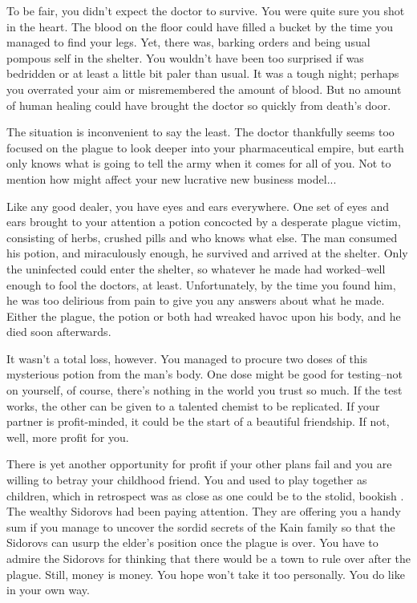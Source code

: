 \documentclass[char]{Pestilence}
\begin{document}
To be fair, you didn't expect the doctor to survive. You were quite sure you shot \cOutsider{\them} in the heart. The blood on the floor could have filled a bucket by the time you managed to find your legs. Yet, there \cOutsider{\they} was, barking orders and being \cOutsider{\their} usual pompous self in the shelter. You wouldn't have been too surprised if \cOutsider{\they} was bedridden or at least a little bit paler than usual. It was a tough night; perhaps you overrated your aim or misremembered the amount of blood. But no amount of human healing could have brought the doctor so quickly from death's door.

The situation is inconvenient to say the least. The doctor thankfully seems too focused on the plague to look deeper into your pharmaceutical empire, but earth only knows what \cOutsider{\they} is going to tell the army when it comes for all of you. Not to mention how \cOutsider{\they} might affect your new lucrative new business model...

Like any good dealer, you have eyes and ears everywhere. One set of eyes and ears brought to your attention a potion concocted by a desperate plague victim, consisting of herbs, crushed pills and who knows what else. The man consumed his potion, and miraculously enough, he survived and arrived at the shelter. Only the uninfected could enter the shelter, so whatever he made had worked--well enough to fool the doctors, at least. Unfortunately, by the time you found him, he was too delirious from pain to give you any answers about what he made. Either the plague, the potion or both had wreaked havoc upon his body, and he died soon afterwards. 

It wasn't a total loss, however. You managed to procure two doses of this mysterious potion from the man's body. One dose might be good for testing--not on yourself, of course, there's nothing in the world you trust so much. If the test works, the other can be given to a talented chemist to be replicated. If your partner is profit-minded, it could be the start of a beautiful friendship. If not, well, more profit for you.

There is yet another opportunity for profit if your other plans fail and you are willing to betray your childhood friend. You and \cApprentice{\intro} used to play together as children, which in retrospect was as close as one could be to the stolid, bookish \cApprentice{}. The wealthy Sidorovs had been paying attention. They are offering you a handy sum if you manage to uncover the sordid secrets of the Kain family so that the Sidorovs can usurp the elder's position once the plague is over. You have to admire the Sidorovs for thinking that there would be a town to rule over after the plague. Still, money is money. You hope \cApprentice{} won't take it too personally. You do like \cApprentice{\them} in your own way.
\end{document}
